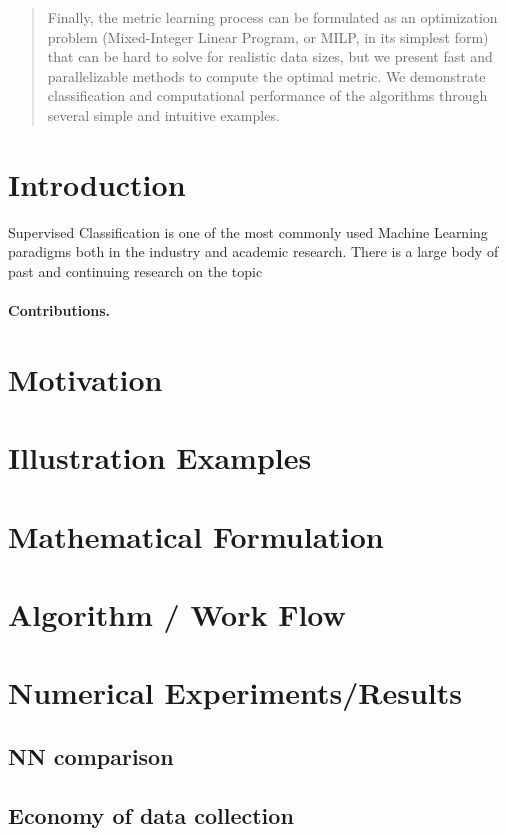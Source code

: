 \documentclass{article}
\begin{document}
\begin{abstract}
Finally, the metric learning process can be formulated as an optimization problem (Mixed-Integer Linear Program, or MILP, 
in its simplest form) that can be hard to solve for realistic data sizes, but we present fast and parallelizable methods to compute the optimal metric.
We demonstrate classification and computational performance of the algorithms through several simple and intuitive examples.
\end{abstract} 


\section{Introduction}  
Supervised Classification is one of the most commonly used Machine Learning paradigms both in the industry and academic research. There is a large body of past and continuing research on the topic
 
\paragraph{Contributions.} 
 
 
\section{Motivation}

\section{Illustration Examples}


\section{Mathematical Formulation} 
 
 
\section{Algorithm / Work Flow}



\section{Numerical Experiments/Results}


\subsection{NN comparison}

\subsection{Economy of data collection}
\end{document}
